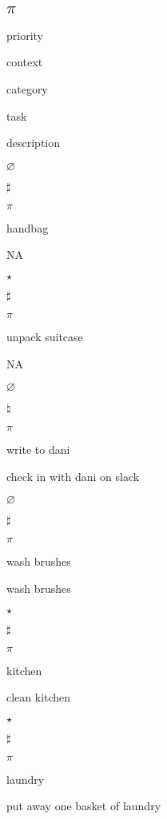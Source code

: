 \documentclass[]{book}
\newenvironment{Shaded}{\begin{snugshade}}{\end{snugshade}}
\newcommand{\KeywordTok}[1]{\textcolor[rgb]{0.13,0.29,0.53}{\textbf{#1}}}
\newcommand{\NormalTok}[1]{#1}
\newcommand{\OperatorTok}[1]{\textcolor[rgb]{0.81,0.36,0.00}{\textbf{#1}}}
\newcommand{\StringTok}[1]{\textcolor[rgb]{0.31,0.60,0.02}{#1}}
\begin{document}
\hypertarget{pi}{%
\subsection{\texorpdfstring{\(\pi\)}{\textbackslash{}pi}}\label{pi}}

\begin{Shaded}
\end{Shaded}

priority

context

category

task

description

\(\varnothing\)

\(\sharp\)

\(\pi\)

handbag

NA

\(\star\)

\(\sharp\)

\(\pi\)

unpack suitcase

NA

\(\varnothing\)

\(\natural\)

\(\pi\)

write to dani

check in with dani on slack

\(\varnothing\)

\(\sharp\)

\(\pi\)

wash brushes

wash brushes

\(\star\)

\(\sharp\)

\(\pi\)

kitchen

clean kitchen

\(\star\)

\(\sharp\)

\(\pi\)

laundry

put away one basket of laundry
\end{document}
